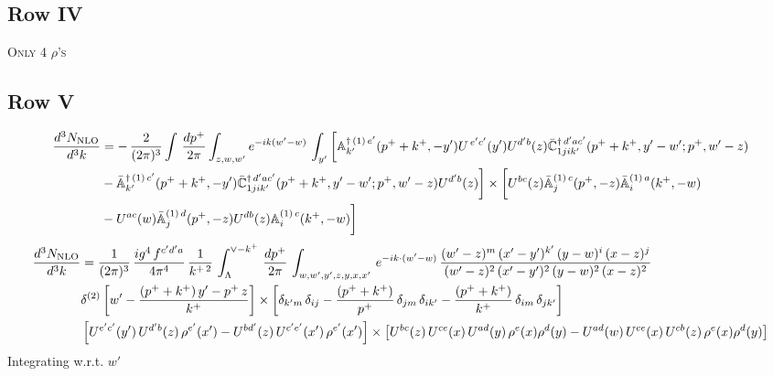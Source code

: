 \documentclass[9pt]{article}
\def\mf#1{\mathbb{#1}}
\numberwithin{equation}{section}
\begin{document}
\subsection{Row IV\,}
\textsc{Only 4 $\rho$'s}
\subsection{Row V\,}
\begin{align}
 \frac{d^{3}N_{\rm NLO}}{d^{3}k} & =   -\,\frac{2}{(2\pi)^{3}} \int\, \frac{dp^{+}}{2\pi}\int_{z,w,w^{\prime}} e^{-ik(w^{\prime}-w)}\,\int_{y^{\prime}}\bigg[\mf{A}^{\dagger\, (1)\,e^{\prime}}_{k^{\prime}}(p^{+}+k^{+},-y^{\prime})U^{\, e^{\prime}c^{\prime}}(y^{\prime})U^{d^{\prime}b}(z) \Bar{\mf{C}}^{\dagger\, d^{\prime}ac^{\prime}}_{1jik^{\prime}}(p^{+}+k^{+},y^{\prime}-w^{\prime}; p^{+},w^{\prime}-z) \notag \\ & -\Bar{\mf{A}}^{\dagger\, (1)\,c^{\prime}}_{k^{\prime}}(p^{+}+k^{+},-y^{\prime}) \Bar{\mf{C}}^{\dagger\, d^{\prime}ac^{\prime}}_{1jik^{\prime}}(p^{+}+k^{+},y^{\prime}-w^{\prime}; p^{+},w^{\prime}-z)U^{d^{\prime}b}(z)\bigg] \times  \bigg[U^{bc}(z)\Bar{\mf{A}}^{(1)\, c}_{j}(p^{+},-z)\Bar{\mf{A}}^{(1)\, a}_{i}(k^{+},-w)\notag \\ & -U^{ac}(w) \Bar{\mf{A}}^{(1)\, d}_{j}(p^{+},-z)U^{db}(z) \mf{A}^{(1)\, c}_{i}(k^{+},- w)\bigg]\nonumber
\end{align}
\begin{align}
     \frac{d^{3}N_{\rm NLO}}{d^{3}k} & = \frac{1}{(2\pi)^{3}}\,\frac{ig^{4}\,f^{c'd'a}}{4\pi^{4}}\, \frac{1}{k^{+\,2}}\,\int_{\Lambda}^{\vee-k^{+}}\, \frac{dp^{+}}{2\pi}\, \int_{w,w',y',z,y,x,x'}\, e^{-ik\cdot (w'-w)}\, \frac{(w'-z)^{m}\,(x'-y')^{k'}\,(y-w)^{i}\,(x-z)^{j}}{(w'-z)^{2}\,(x'-y')^{2}\,(y-w)^{2}\,(x-z)^{2}}\notag \\ & \delta^{(2)}\left[w'-\frac{(p^{+}+k^{+})\,y'-p^{+}\,z}{k^{+}}\right]\times \left[\delta_{k'm}\,\delta_{ij}-\frac{(p^{+}+k^{+})}{p^{+}}\,\delta_{jm}\,\delta_{ik'}-\frac{(p^{+}+k^{+})}{k^{+}}\, \delta_{im}\, \delta_{jk'}\right]\notag \\ & \left[U^{e'c'}(y')\,U^{d'b}(z)\,\rho^{e'}(x')-U^{bd'}(z)\,U^{c'e'}(x')\,\rho^{e'}(x')\right]\times \left[U^{bc}(z)\,U^{ce}(x)\,U^{ad}(y)\,\rho^{e}(x)\rho^{d}(y)-U^{ad}(w)\,U^{ce}(x)\,U^{cb}(z)\,\rho^{e}(x)\rho^{d}(y)\right]
\end{align}
Integrating w.r.t. $w'$
\end{document}
